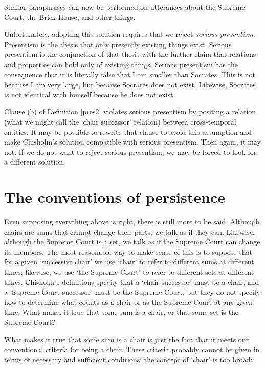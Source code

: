 \documentclass[11pt]{article}
\begin{document}
\begin{spacing}{1.5}
Similar paraphrases can now be performed on utterances about the
Supreme Court, the Brick House, and other things.

Unfortunately, adopting this solution requires that we reject {\em
  serious presentism}.  Presentism is the thesis that only presently
existing things exist.  Serious presentism is the conjunction of that
thesis with the further claim that relations and properties can hold
only of existing things.  Serious presentism has the consequence that
it is literally false that I am smaller than Socrates.  This is not
because I am very large, but because Socrates does not exist.
Likewise, Socrates is not identical with himself because he does not
exist.

Clause (b) of Definition \ref{pres2} violates serious presentism by
positing a relation (what we might call the `chair successor'
relation) between cross-temporal entities.  It may be possible to
rewrite that clause to avoid this assumption and make Chisholm's
solution compatible with serious presentism.  Then again, it may not.
If we do not want to reject serious presentism, we may be forced to
look for a different solution.

\section{The conventions of persistence}
\label{set-convention}
Even supposing everything above is right, there is still more to be
said.  Although chairs are sums that cannot change their parts, we
talk as if they can.  Likewise, although the Supreme Court is a set,
we talk as if the Supreme Court can change its members.  The most
reasonable way to make sense of this is to suppose that for a given
`successive chair' we use `chair' to refer to different sums at
different times; likewise, we use `the Supreme Court' to refer to
different sets at different times.  Chisholm's definitions specify
that a `chair successor' must be a chair, and a `Supreme Court
successor' must be the Supreme Court, but they do not specify how to
determine what counts as a chair or as the Supreme Court at any given
time.  What makes it true that some sum is a chair, or that some set
is the Supreme Court?

What makes it true that some sum is a chair is just the fact that it
meets our conventional criteria for being a chair.  These criteria
probably cannot be given in terms of necessary and sufficient
conditions; the concept of `chair' is too broad:


\end{spacing}
\end{document}
